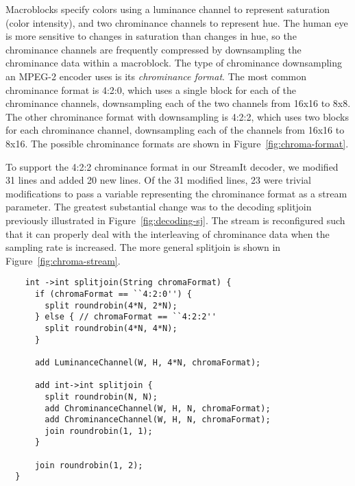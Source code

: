 
Macroblocks specify colors using a luminance channel to represent
saturation (color intensity), and two chrominance channels to
represent hue. The human eye is more sensitive to changes in
saturation than changes in hue, so the chrominance channels are
frequently compressed by downsampling the chrominance data within a
macroblock. The type of chrominance downsampling an MPEG-2 encoder
uses is its {\it chrominance format}. The most common chrominance
format is 4:2:0, which uses a single block for each of the chrominance
channels, downsampling each of the two channels from 16x16 to 8x8.
The other chrominance format with downsampling is 4:2:2, which uses
two blocks for each chrominance channel, downsampling each of the
channels from 16x16 to 8x16. The possible chrominance formats are
shown in Figure~\ref{fig:chroma-format}.

To support the 4:2:2 chrominance format in our StreamIt decoder, we
modified 31 lines and added 20 new lines. Of the 31 modified lines, 23
were trivial modifications to pass a variable representing the
chrominance format as a stream parameter. The greatest substantial
change was to the decoding splitjoin previously illustrated in
Figure~\ref{fig:decoding-sj}. The stream is reconfigured such that it
can properly deal with the interleaving of chrominance data when the
sampling rate is increased. The more general splitjoin is shown in
Figure~\ref{fig:chroma-stream}.

\begin{figure*}[t]
  \begin{scriptsize}
    \begin{verbatim}
    int ->int splitjoin(String chromaFormat) {
      if (chromaFormat == ``4:2:0'') {
        split roundrobin(4*N, 2*N);
      } else { // chromaFormat == ``4:2:2''
        split roundrobin(4*N, 4*N);
      }

      add LuminanceChannel(W, H, 4*N, chromaFormat);

      add int->int splitjoin {
        split roundrobin(N, N);
        add ChrominanceChannel(W, H, N, chromaFormat);
        add ChrominanceChannel(W, H, N, chromaFormat);
        join roundrobin(1, 1);
      }

      join roundrobin(1, 2);
  }
  \end{verbatim}
  \end{scriptsize}
  \caption{Decoding stream to handle 4:2:0 and 4:2:2 chroma formats.}
  \label{fig:chroma-stream}
\end{figure*}
